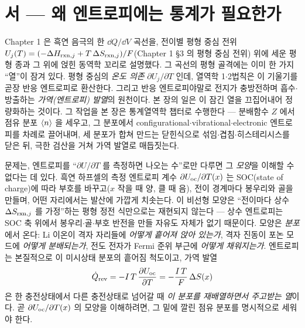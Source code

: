 \section*{서 --- 왜 엔트로피에는 통계가 필요한가}

Chapter 1 은 흑연 음극의 한 $\dd Q/\dd V$ 곡선을, 전이별 평형 중심 전위
$U_j(T)=(-\Delta H_{\mathrm{rxn},j}+T\,\Delta S_{\mathrm{rxn},j})/F$(Chapter 1 §3 의 평형 중심 전위) 위에 세운 평형 종과 그 위에
얹힌 동역학 꼬리로 설명했다. 그 곡선의 평형 골격에는 이미 한 가지 ``열''이 잠겨 있다. 평형 중심의
\emph{온도 의존} $\partial U_j/\partial T$ 인데, 열역학 1$\cdot$2법칙은 이 기울기를 곧장 반응 엔트로피로 환산한다.
그리고 반응 엔트로피야말로 전지가 충방전하며 흡수$\cdot$방출하는 \emph{가역(엔트로피) 발열}의 원천이다.
본 장의 일은 이 잠긴 열을 끄집어내어 정량화하는 것이다. 그 작업을 본 장은 통계열역학 챕터로 수행한다 ---
분배함수 $Z$ 에서 점유 분포 $\langle n\rangle$ 을 세우고, 그 분포에서 configurational$\cdot$vibrational$\cdot$electronic
엔트로피를 차례로 끌어내며, 세 분포가 합쳐 만드는 닫힌식으로 섞임$\cdot$겹침$\cdot$히스테리시스를 닫은 뒤,
극한 검산을 거쳐 가역 발열로 매듭짓는다.

문제는, 엔트로피를 ``$\partial U/\partial T$ 를 측정하면 나오는 수''로만 다루면 그 \emph{모양}을 이해할 수
없다는 데 있다. 흑연 하프셀의 측정 엔트로피 계수 $\partial U_{\mathrm{oc}}/\partial T(x)$ 는 SOC(state of charge)에 따라
부호를 바꾸고($x$ 작을 때 양, 클 때 음), 전이 경계마다 봉우리와 골을 만들며, 어떤 자리에서는 발산에 가깝게
치솟는다. 이 비선형 모양은 ``전이마다 상수 $\Delta S_{\mathrm{rxn},j}$ 를 가정''하는 평형 정전 식만으로는 재현되지
않는다 --- 상수 엔트로피는 SOC 축 위에서 봉우리$\cdot$골$\cdot$부호 반전을 만들 자유도 자체가 없기 때문이다.
모양은 \emph{분포}에서 온다: Li 이온이 격자 자리들에 \emph{어떻게 흩어져 앉아 있는가}, 격자 진동이 포논
모드에 \emph{어떻게 분배되는가}, 전도 전자가 Fermi 준위 부근에 \emph{어떻게 채워지는가}. 엔트로피는 본질적으로
이 미시상태 분포의 흩어짐 척도이고, 가역 발열
\[
\dot Q_{\mathrm{rev}}=-I\,T\,\frac{\partial U_{\mathrm{oc}}}{\partial T}=-\frac{I\,T}{F}\,\Delta S(x)
\]
은 한 충전상태에서 다른 충전상태로 넘어갈 때 \emph{이 분포를 재배열하면서 주고받는 열}이다. 곧
$\partial U_{\mathrm{oc}}/\partial T(x)$ 의 모양을 이해하려면, 그 밑에 깔린 점유 분포를 명시적으로 세워야 한다.

